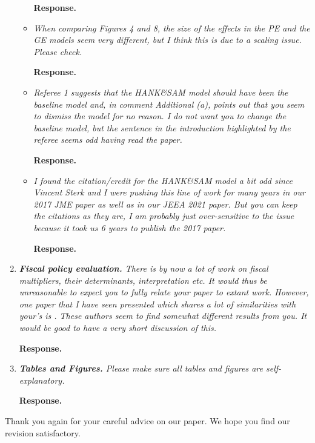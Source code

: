 \documentclass[12pt,letterpaper,english]{article}
\begin{document}
\begin{enumerate}
\begin{itemize}
		\noindent \textbf{Response.} 
		
		\item \textit{When comparing Figures 4 and 8, the size of the effects in the PE and the GE models seem very different, but I think this is due to a scaling issue. Please check.}
		
		\noindent \textbf{Response.} 
		
		\item \textit{Referee 1 suggests that the HANK\&SAM model should have been the baseline model and, in comment Additional (a), points out that you seem to dismiss the model for no reason. I do not want you to change the baseline model, but	the sentence in the introduction highlighted by the referee seems odd having read the paper.}
		
		\noindent \textbf{Response.} 
		
		\item \textit{I found the citation/credit for the HANK\&SAM model a bit odd since Vincent Sterk and I were pushing this line of work for many years in our 2017 JME	paper as well as in our JEEA 2021 paper. But you can keep the citations as they are, I am probably just over-sensitive to the issue because it took us 6 years to publish the 2017 paper.}
		
		\noindent \textbf{Response.} 
	\end{itemize}
	
\item \textit{\textbf{Fiscal policy evaluation.} There is by now a lot of work on fiscal multipliers, their determinants, interpretation etc. It would thus be unreasonable to expect you to fully relate your paper to extant work. However, one paper that I have seen presented which shares a lot of similarities with your's is \citet{broer2024stimulus}. These authors seem to find somewhat different results from you. It would be good	to have a very short discussion of this.}	

\noindent \textbf{Response.} 

\item \textit{\textbf{Tables and Figures.} Please make sure all tables and figures are self-explanatory.} 

\noindent \textbf{Response.} 

\end{enumerate}

\bigskip

\noindent Thank you again for your careful advice on our paper. We hope you find our revision satisfactory.



\end{document}
